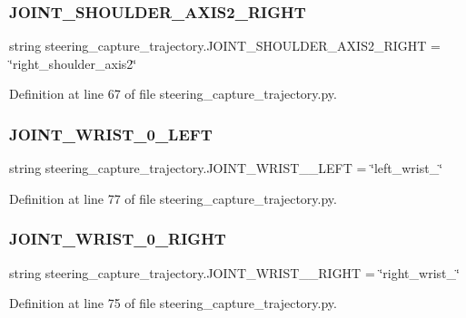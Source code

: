 \subsubsection{\texorpdfstring{JOINT\_SHOULDER\_AXIS2\_RIGHT}{JOINT\_SHOULDER\_AXIS2\_RIGHT}}
{\footnotesize\ttfamily string steering\+\_\+capture\+\_\+trajectory.\+J\+O\+I\+N\+T\+\_\+\+S\+H\+O\+U\+L\+D\+E\+R\+\_\+\+A\+X\+I\+S2\+\_\+\+R\+I\+G\+HT = \char`\"{}right\+\_\+shoulder\+\_\+axis2\char`\"{}}



Definition at line 67 of file steering\+\_\+capture\+\_\+trajectory.\+py.

\mbox{\label{namespacesteering__capture__trajectory_a58d4b644a3b5fa765a5e2279e154dae8}} 
\subsubsection{\texorpdfstring{JOINT\_WRIST\_0\_LEFT}{JOINT\_WRIST\_0\_LEFT}}
{\footnotesize\ttfamily string steering\+\_\+capture\+\_\+trajectory.\+J\+O\+I\+N\+T\+\_\+\+W\+R\+I\+S\+T\+\_\+\_\+\+L\+E\+FT = \char`\"{}left\+\_\+wrist\+\_\char`\"{}}



Definition at line 77 of file steering\+\_\+capture\+\_\+trajectory.\+py.

\mbox{\label{namespacesteering__capture__trajectory_a383cd035a5617d903cae0ef48987d360}} 
\subsubsection{\texorpdfstring{JOINT\_WRIST\_0\_RIGHT}{JOINT\_WRIST\_0\_RIGHT}}
{\footnotesize\ttfamily string steering\+\_\+capture\+\_\+trajectory.\+J\+O\+I\+N\+T\+\_\+\+W\+R\+I\+S\+T\+\_\+\_\+\+R\+I\+G\+HT = \char`\"{}right\+\_\+wrist\+\_\char`\"{}}



Definition at line 75 of file steering\+\_\+capture\+\_\+trajectory.\+py.

